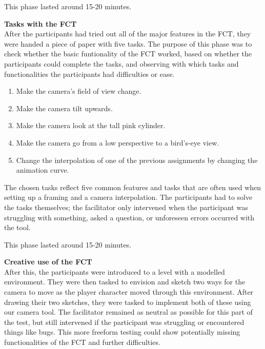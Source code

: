 This phase lasted around 15-20 minutes.

\textbf{Tasks with the FCT}\\
After the participants had tried out all of the major features in the FCT, they were handed a piece of paper with five tasks. The purpose of this phase was to check whether the basic funtionality of the FCT worked, based on whether the participants could complete the tasks, and observing with which tasks and functionalities the participants had difficulties or ease.


\begin{enumerate}
\item Make the camera's field of view change.
\item Make the camera tilt upwards.
\item Make the camera look at the tall pink cylinder.
\item Make the camera go from a low perspective to a bird's-eye view.
\item Change the interpolation of one of the previous assignments by changing the animation curve.
\end{enumerate} 

The chosen tasks reflect five common features and tasks that are often used when setting up a framing and a camera interpolation. The participants had to solve the tasks themselves; the facilitator only intervened when the participant was struggling with something, asked a question, or unforeseen errors occurred with the tool.

This phase lasted around 15-20 minutes.

\textbf{Creative use of the FCT}\\
After this, the participants were introduced to a level with a modelled environment. They were then tasked to envision and sketch two ways for the camera to move as the player character moved through this environment. After drawing their two sketches, they were tasked to implement both of these using our camera tool. The facilitator remained as neutral as possible for this part of the test, but still intervened if the participant was struggling or encountered things like bugs. This more freeform testing could show potentially missing functionalities of the FCT and further difficulties.

